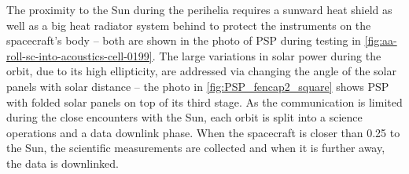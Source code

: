 The proximity to the Sun during the perihelia requires a sunward heat shield as well as a big heat radiator system behind to protect the instruments on the spacecraft's body -- both are shown in the photo of PSP during testing in \autoref{fig:aa-roll-sc-into-acoustics-cell-0199}. The large variations in solar power during the orbit, due to its high ellipticity, are addressed via changing the angle of the solar panels with solar distance -- the photo in \autoref{fig:PSP_fencap2_square} shows PSP with folded solar panels on top of its third stage. As the communication is limited during the close encounters with the Sun, each orbit is split into a science operations and a data downlink phase. When the spacecraft is closer than \SI{0.25}{\au} to the Sun, the scientific measurements are collected and when it is further away, the data is downlinked.
\begin{figure}[htb]
	\begin{floatrow}
\end{floatrow}
\end{figure}
